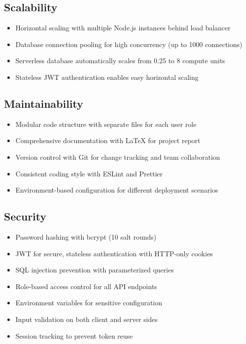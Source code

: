 \subsection{Scalability}
\begin{itemize}
    \item Horizontal scaling with multiple Node.js instances behind load balancer
    \item Database connection pooling for high concurrency (up to 1000 connections)
    \item Serverless database automatically scales from 0.25 to 8 compute units
    \item Stateless JWT authentication enables easy horizontal scaling
\end{itemize}

\subsection{Maintainability}
\begin{itemize}
    \item Modular code structure with separate files for each user role
    \item Comprehensive documentation with LaTeX for project report
    \item Version control with Git for change tracking and team collaboration
    \item Consistent coding style with ESLint and Prettier
    \item Environment-based configuration for different deployment scenarios
\end{itemize}

\subsection{Security}
\begin{itemize}
    \item Password hashing with bcrypt (10 salt rounds)
    \item JWT for secure, stateless authentication with HTTP-only cookies
    \item SQL injection prevention with parameterized queries
    \item Role-based access control for all API endpoints
    \item Environment variables for sensitive configuration
    \item Input validation on both client and server sides
    \item Session tracking to prevent token reuse
\end{itemize}

